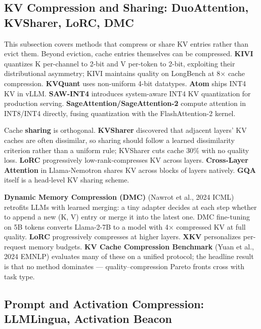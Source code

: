 \documentclass{article}
\begin{document}
\subsection{KV Compression and Sharing: DuoAttention, KVSharer, LoRC, DMC}\label{kv-compression-and-sharing-duoattention-kvsharer-lorc-dmc}

This subsection covers methods that compress or share KV entries rather than evict them. Beyond eviction, cache entries themselves can be compressed. \textbf{KIVI} quantizes K per-channel to 2-bit and V per-token to 2-bit, exploiting their distributional asymmetry; KIVI maintains quality on LongBench at 8× cache compression. \textbf{KVQuant} uses non-uniform 4-bit datatypes. \textbf{Atom} \citep{zhao20242023} ships INT4 KV in vLLM. \textbf{SAW-INT4} \citep{jia20262026} introduces system-aware INT4 KV quantization for production serving. \textbf{SageAttention/SageAttention-2} \citep{zhang20242024} compute attention in INT8/INT4 directly, fusing quantization with the FlashAttention-2 kernel.

Cache \textbf{sharing} is orthogonal. \textbf{KVSharer} \citep{yang20242024} discovered that adjacent layers' KV caches are often dissimilar, so sharing should follow a learned dissimilarity criterion rather than a uniform rule; KVSharer cuts cache 30\% with no quality loss. \textbf{LoRC} \citep{zhang20242024} progressively low-rank-compresses KV across layers. \textbf{Cross-Layer Attention} in Llama-Nemotron shares KV across blocks of layers natively. \textbf{GQA} itself is a head-level KV sharing scheme.

\textbf{Dynamic Memory Compression (DMC)} (Nawrot et al., 2024 ICML) retrofits LLMs with learned merging: a tiny adapter decides at each step whether to append a new (K, V) entry or merge it into the latest one. DMC fine-tuning on 5B tokens converts Llama-2-7B to a model with 4× compressed KV at full quality. \textbf{LoRC} progressively compresses at higher layers. \textbf{XKV} \citep{li20242024} personalizes per-request memory budgets. \textbf{KV Cache Compression Benchmark} (Yuan et al., 2024 EMNLP) evaluates many of these on a unified protocol; the headline result is that no method dominates --- quality--compression Pareto fronts cross with task type.

\subsection{Prompt and Activation Compression: LLMLingua, Activation Beacon}\label{prompt-and-activation-compression-llmlingua-activation-beacon}
\end{document}
